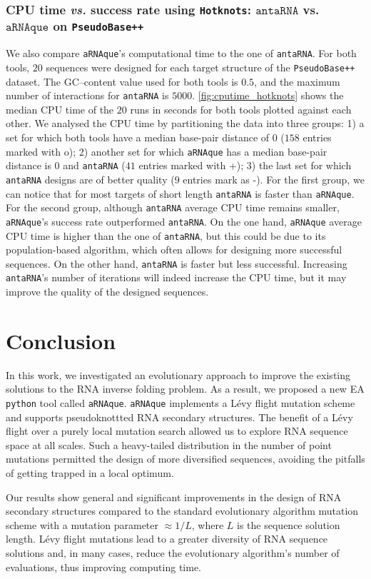\subsubsection{CPU time \emph{vs.} success rate using \texttt{Hotknots}: \(\texttt{antaRNA}\) vs. \(\texttt{aRNAque}\) on \texttt{PseudoBase++}}
We also compare \texttt{aRNAque}'s computational time to the one of \texttt{antaRNA}. For both tools, $20$ sequences were designed for each target structure of the \texttt{PseudoBase++} dataset. The GC--content value used for both tools is $0.5$, and the maximum number of interactions for  \texttt{antaRNA} is $5000$. 
\autoref{fig:cputime_hotknots} shows the median \ac{CPU} time of the $20$ runs in seconds for both tools plotted against each other. We analysed the \ac{CPU} time by partitioning the data into three groups: 1) a set for which both tools have a median base-pair distance of $0$ ($158$ entries marked with o); 2) another set for which \texttt{aRNAque} has a median base-pair distance is 0 and \texttt{antaRNA} ($41$ entries marked with +); 3) the last set for which \texttt{antaRNA} designs are of better quality ($9$ entries mark as -). For the first group, we can notice that for most targets of short length \texttt{antaRNA} is faster than \texttt{aRNAque}. For the second group, although \texttt{antaRNA} average \ac{CPU} time remains smaller, \texttt{aRNAque}'s success rate outperformed \texttt{antaRNA}.  On the one hand,  \texttt{aRNAque} average \ac{CPU} time is higher than the one of \texttt{antaRNA}, but this could be due to its population-based algorithm, which often allows for designing more successful sequences. On the other hand, \texttt{antaRNA} is faster but less successful. Increasing \texttt{antaRNA}'s number of iterations will indeed increase the \ac{CPU} time, but it may improve the quality of the designed sequences.

\section{Conclusion}
In this work, we investigated an evolutionary approach to improve the existing solutions to the \ac{RNA} inverse folding problem. As a result, we proposed a new \ac{EA} \texttt{python} tool called \texttt{aRNAque}.  \texttt{aRNAque} implements a Lévy flight mutation scheme and supports pseudoknottted \ac{RNA} secondary structures. The benefit of a Lévy flight over a purely local mutation search allowed us to explore \ac{RNA} sequence space at all scales. Such a heavy-tailed distribution in the number of point mutations permitted the design of more diversified sequences, avoiding the pitfalls of getting trapped in a local optimum.

Our results show general and significant improvements in the design of \ac{RNA} secondary structures compared to the standard evolutionary algorithm mutation scheme with a mutation parameter $\approx 1/L$, where $L$ is the sequence solution length. Lévy flight mutations lead to a greater diversity of \ac{RNA} sequence solutions and, in many cases, reduce the evolutionary algorithm’s number of evaluations, thus improving computing time. 
